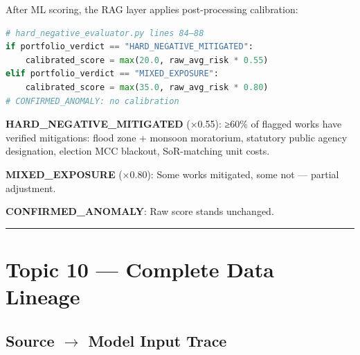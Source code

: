\documentclass[11pt,a4paper]{article}
\begin{document}
After ML scoring, the RAG layer applies post-processing calibration:

\begin{lstlisting}[language=Python]
# hard_negative_evaluator.py lines 84–88
if portfolio_verdict == "HARD_NEGATIVE_MITIGATED":
    calibrated_score = max(20.0, raw_avg_risk * 0.55)
elif portfolio_verdict == "MIXED_EXPOSURE":
    calibrated_score = max(35.0, raw_avg_risk * 0.80)
# CONFIRMED_ANOMALY: no calibration
\end{lstlisting}


\textbf{HARD\_NEGATIVE\_MITIGATED} (×0.55): ≥60\% of flagged works have verified mitigations: flood zone + monsoon moratorium, statutory public agency designation, election MCC blackout, SoR-matching unit costs.

\textbf{MIXED\_EXPOSURE} (×0.80): Some works mitigated, some not --- partial adjustment.

\textbf{CONFIRMED\_ANOMALY}: Raw score stands unchanged.

\vspace{1em}\hrule\vspace{1em}

\section{Topic 10 --- Complete Data Lineage}

\subsection{Source $\rightarrow$ Model Input Trace}
\end{document}
